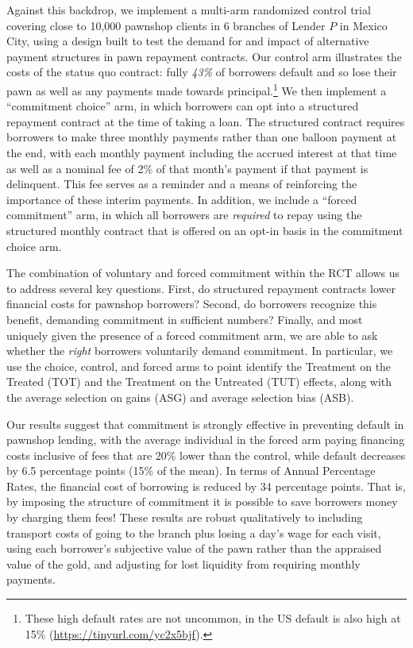 \documentclass[oneside,11pt]{article}
\begin{document}
Against this backdrop, we implement a multi-arm randomized control trial covering close to 10,000 pawnshop clients in 6 branches of Lender $P$ in Mexico City, using a design built to test the demand for and impact of alternative payment structures in pawn repayment contracts. Our control arm illustrates the costs of the status quo contract: fully \emph{43\%} of borrowers default and so lose their pawn as well as any payments made towards principal.\footnote{These high default rates are not uncommon, in the US default is also high at 15\% (\url{https://tinyurl.com/yc2x5bjf}).} We then implement a ``commitment choice'' arm, in which borrowers can opt into a structured repayment contract at the time of taking a loan. The structured contract requires borrowers to make three monthly payments rather than one balloon payment at the end, with each monthly payment including the accrued interest at that time as well as a nominal fee of 2\% of that month's payment if that payment is delinquent. This fee serves as a reminder and a means of reinforcing the importance of these interim payments. In addition, we include a ``forced commitment'' arm, in which all borrowers are \emph{required} to repay using the structured monthly contract that is offered on an opt-in basis in the commitment choice arm. 

The combination of voluntary and forced commitment within the RCT allows us to address several key questions. First, do structured repayment contracts lower financial costs for pawnshop borrowers? Second, do borrowers recognize this benefit, demanding commitment in sufficient numbers?  Finally, and most uniquely given the presence of a forced commitment arm, we are able to ask whether the \textit{right} borrowers voluntarily demand commitment. In particular, we use the choice, control, and forced arms to point identify the Treatment on the Treated (TOT) and the Treatment on the Untreated (TUT) effects, along with the average selection on gains (ASG) and average selection bias (ASB). 
	
Our results suggest that commitment is strongly effective in preventing default in pawnshop lending, with the average individual in the forced arm paying financing costs inclusive of fees that are 20\% lower than the control, while default decreases by 6.5 percentage points (15\% of the mean). In terms of Annual Percentage Rates, the financial cost of borrowing is reduced by 34 percentage points. That is, by imposing the structure of commitment it is possible to save borrowers money by charging them fees! These results are robust qualitatively to including transport costs of going to the branch plus losing a day's wage for each visit, using each borrower's subjective value of the pawn rather than the appraised value of the gold, and adjusting for lost liquidity from requiring monthly payments.
\end{document}
